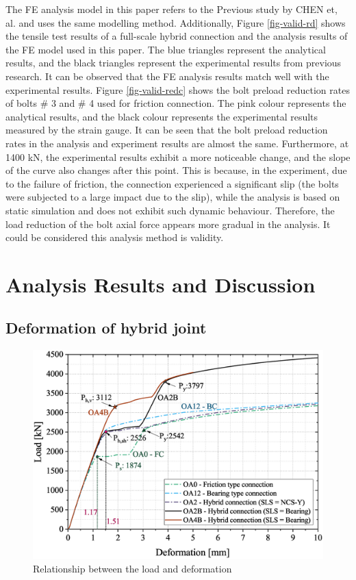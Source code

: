 The FE analysis model in this paper refers to the Previous study by CHEN et, al. \cite{Chen2023MechanicalConnections} and uses the same modelling method. Additionally, Figure \ref{fig-valid-rd} shows the tensile test results of a full-scale hybrid connection \cite{chen_experimental_2024} and the analysis results of the FE model used in this paper. The blue triangles represent the analytical results, and the black triangles represent the experimental results from previous research. It can be observed that the FE analysis results match well with the experimental results. Figure \ref{fig-valid-redc} shows the bolt preload reduction rates of bolts \# 3 and \# 4 used for friction connection. The pink colour represents the analytical results, and the black colour represents the experimental results measured by the strain gauge. It can be seen that the bolt preload reduction rates in the analysis and experiment results are almost the same. Furthermore, at 1400 kN, the experimental results exhibit a more noticeable change, and the slope of the curve also changes after this point. This is because, in the experiment, due to the failure of friction, the connection experienced a significant slip (the bolts were subjected to a large impact due to the slip), while the analysis is based on static simulation and does not exhibit such dynamic behaviour. Therefore, the load reduction of the bolt axial force appears more gradual in the analysis. It could be considered this analysis method is validity. 

\section{Analysis Results and Discussion}

\subsection{Deformation of hybrid joint}

\begin{figure}[htbp]
    \centering
    \includegraphics[width=0.7\linewidth]{imgs/ch7/LDef-total.eps}
    \caption{Relationship between the load and deformation}
    \label{fig-ldef}
\end{figure}

